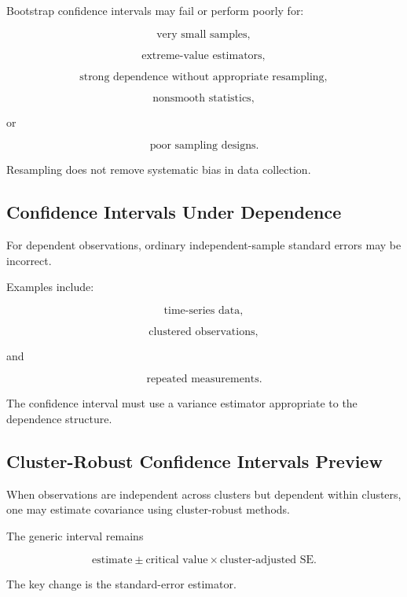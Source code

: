 Bootstrap confidence intervals may fail or perform poorly for:

\[
\boxed{
\text{very small samples},
}
\]

\[
\boxed{
\text{extreme-value estimators},
}
\]

\[
\boxed{
\text{strong dependence without appropriate resampling},
}
\]

\[
\boxed{
\text{nonsmooth statistics},
}
\]

or

\[
\boxed{
\text{poor sampling designs}.
}
\]

Resampling does not remove systematic bias in data collection.

\subsection{Confidence Intervals Under Dependence}
\label{subsec:ci-under-dependence}

For dependent observations, ordinary independent-sample standard errors
may be incorrect.

Examples include:

\[
\boxed{
\text{time-series data},
}
\]

\[
\boxed{
\text{clustered observations},
}
\]

and

\[
\boxed{
\text{repeated measurements}.
}
\]

The confidence interval must use a variance estimator appropriate to the
dependence structure.

\subsection{Cluster-Robust Confidence Intervals Preview}
\label{subsec:cluster-robust-ci-preview}

When observations are independent across clusters but dependent within
clusters, one may estimate covariance using cluster-robust methods.

The generic interval remains

\[
\boxed{
\text{estimate}
\pm
\text{critical value}
\times
\text{cluster-adjusted SE}.
}
\]

The key change is the standard-error estimator.

